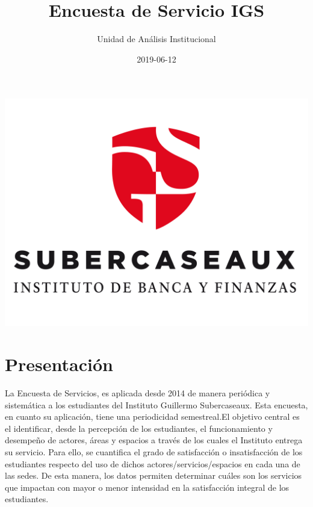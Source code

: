 \documentclass[]{book}
\title{Encuesta de Servicio IGS}
\author{Unidad de Análisis Institucional}
\date{2019-06-12}
\begin{document}
\maketitle

{
\setcounter{tocdepth}{1}
\tableofcontents
}
\chapter*{}\label{section}

\begin{center}\includegraphics{images/logoieb} \end{center}

\chapter*{Presentación}\label{presentacion}

La Encuesta de Servicios, es aplicada desde 2014 de manera periódica y
sistemática a los estudiantes del Instituto Guillermo Subercaseaux. Esta
encuesta, en cuanto su aplicación, tiene una periodicidad semestreal.El
objetivo central es el identificar, desde la percepción de los
estudiantes, el funcionamiento y desempeño de actores, áreas y espacios
a través de los cuales el Instituto entrega su servicio. Para ello, se
cuantifica el grado de satisfacción o insatisfacción de los estudiantes
respecto del uso de dichos actores/servicios/espacios en cada una de las
sedes. De esta manera, los datos permiten determinar cuáles son los
servicios que impactan con mayor o menor intensidad en la satisfacción
integral de los estudiantes.
\end{document}
